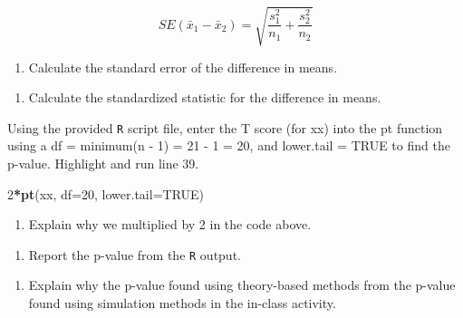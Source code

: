 \documentclass[
]{report}
\newenvironment{Shaded}{\begin{snugshade}}{\end{snugshade}}
\newcommand{\DataTypeTok}[1]{\textcolor[rgb]{0.13,0.29,0.53}{#1}}
\newcommand{\DecValTok}[1]{\textcolor[rgb]{0.00,0.00,0.81}{#1}}
\newcommand{\KeywordTok}[1]{\textcolor[rgb]{0.13,0.29,0.53}{\textbf{#1}}}
\newcommand{\NormalTok}[1]{#1}
\newcommand{\OperatorTok}[1]{\textcolor[rgb]{0.81,0.36,0.00}{\textbf{#1}}}
\newcommand{\OtherTok}[1]{\textcolor[rgb]{0.56,0.35,0.01}{#1}}
\providecommand{\tightlist}{%
  \setlength{\itemsep}{0pt}\setlength{\parskip}{0pt}}
\begin{document}
\[SE(\bar{x}_1 -\bar{x}_2)=\sqrt{\frac{s_1^2}{n_1}+\frac{s_2^2}{n_2}}\]
\newpage

\begin{enumerate}
\def\labelenumi{\arabic{enumi}.}
\setcounter{enumi}{1}
\tightlist
\item
  Calculate the standard error of the difference in means.
\end{enumerate}

\vspace{0.5in}

\begin{enumerate}
\def\labelenumi{\arabic{enumi}.}
\setcounter{enumi}{2}
\tightlist
\item
  Calculate the standardized statistic for the difference in means.
\end{enumerate}

\vspace{0.5in}

Using the provided \texttt{R} script file, enter the T score (for xx) into the pt function using a df = minimum(n - 1) = 21 - 1 = 20, and lower.tail = TRUE to find the p-value. Highlight and run line 39.

\begin{Shaded}
\begin{Highlighting}[]
\DecValTok{2}\OperatorTok{*}\KeywordTok{pt}\NormalTok{(xx, }\DataTypeTok{df=}\DecValTok{20}\NormalTok{, }\DataTypeTok{lower.tail=}\OtherTok{TRUE}\NormalTok{)}
\end{Highlighting}
\end{Shaded}

\begin{enumerate}
\def\labelenumi{\arabic{enumi}.}
\setcounter{enumi}{3}
\tightlist
\item
  Explain why we multiplied by 2 in the code above.
\end{enumerate}

\vspace{0.3in}

\begin{enumerate}
\def\labelenumi{\arabic{enumi}.}
\setcounter{enumi}{4}
\tightlist
\item
  Report the p-value from the \texttt{R} output.
\end{enumerate}

\vspace{0.3in}

\begin{enumerate}
\def\labelenumi{\arabic{enumi}.}
\setcounter{enumi}{5}
\tightlist
\item
  Explain why the p-value found using theory-based methods from the p-value found using simulation methods in the in-class activity.
\end{enumerate}
\end{document}
